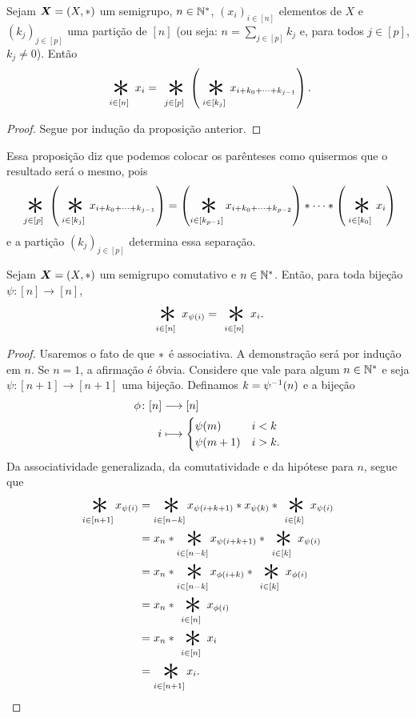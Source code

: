 \begin{proposition}
Sejam $\bm X=(X,\ast)$ um semigrupo, $n \in \mathbb{N}^*$, $(x_i)_{i \in [n]}$ elementos de $X$ e $(k_j)_{j \in [p]}$ uma partição de $[n]$ (ou seja: $n = \sum_{j \in [p]} k_j$ e, para todos $j \in [p]$, $k_j \neq 0$). Então
	\begin{equation*}
	\bigopb_{i \in [n]} x_i = \bigopb_{j \in [p]}\left(\bigopb_{i \in [k_j]} x_{i + k_0 + \cdots + k_{j-1}}\right).
	\end{equation*}
\end{proposition}
\begin{proof}
Segue por indução da proposição anterior.
\end{proof}

Essa proposição diz que podemos colocar os parênteses como quisermos que o resultado será o mesmo, pois
	\begin{equation*}
	\bigopb_{j \in [p]}\left(\bigopb_{i \in [k_j]} x_{i + k_0 + \cdots + k_{j-1}}\right) = \left(\bigopb_{i \in [k_{p-1}]} x_{i + k_0 + \cdots + k_{p-2}}\right) \opb \cdots \opb \left(\bigopb_{i \in [k_0]} x_i\right)
	\end{equation*}
e a partição $(k_j)_{j \in [p]}$ determina essa separação.

\begin{proposition}
Sejam $\bm X=(X, \ast )$ um semigrupo comutativo e $n \in \mathbb{N}^*$. Então, para toda bijeção $\psi\colon [n] \to [n]$,
	\begin{equation*}
	\bigopb_{i \in [n]} x_{\psi(i)} = \bigopb_{i \in [n]} x_i.
	\end{equation*}
\end{proposition}
\begin{proof}
Usaremos o fato de que $\ast$ é associativa. A demonstração será por indução em $n$. Se $n=1$, a afirmação é óbvia. Considere que vale para algum $n \in \mathbb{N}^*$ e seja $\psi\colon [n+1] \to [n+1]$ uma bijeção. Definamos $k = \psi^{-1}(n)$ e a bijeção
	\begin{align*}
	\func{\phi}{[n]}{[n]}{i}{
		\begin{cases}
		\psi(m) 		& i<k \\
		\psi(m+1) & i>k.
		\end{cases}
	}
	\end{align*}
Da associatividade generalizada, da comutatividade e da hipótese para $n$, segue que
	\begin{align*}
	\bigopb_{i \in [n+1]} x_{\psi(i)}
		&= \bigopb_{i \in [n-k]} x_{\psi(i+k+1)} \opb x_{\psi(k)} \opb \bigopb_{i \in [k]} x_{\psi(i)} \\
		&= x_{n} \opb \bigopb_{i \in [n-k]} x_{\psi(i+k+1)} \opb \bigopb_{i \in [k]} x_{\psi(i)} \\
		&= x_{n} \opb \bigopb_{i \in [n-k]} x_{\phi(i+k)} \opb \bigopb_{i \in [k]} x_{\phi(i)} \\
		&= x_n \opb \bigopb_{i \in [n]} x_{\phi(i)}\\
		&= x_n \opb \bigopb_{i \in [n]} x_i \\
		&= \bigopb_{i \in [n+1]} x_i. \qedhere
	\end{align*}
\end{proof}


